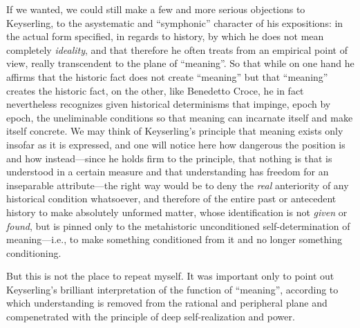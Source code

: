 If we wanted, we could still make a few and more serious objections to Keyserling, to the asystematic and ``symphonic'' character of his expositions: in the actual form specified, in regards to history, by which he does not mean completely \emph{ideality}, and that therefore he often treats from an empirical point of view, really transcendent to the plane of ``meaning''. So that while on one hand he affirms that the historic fact does not create ``meaning'' but that ``meaning'' creates the historic fact, on the other, like Benedetto Croce, he in fact nevertheless recognizes given historical determinisms that impinge, epoch by epoch, the uneliminable conditions so that meaning can incarnate itself and make itself concrete. We may think of Keyserling's principle that meaning exists only insofar as it is expressed, and one will notice here how dangerous the position is and how instead---since he holds firm to the principle, that nothing is that is understood in a certain measure and that understanding has freedom for an inseparable attribute---the right way would be to deny the \emph{real} anteriority of any historical condition whatsoever, and therefore of the entire past or antecedent history to make absolutely unformed matter, whose identification is not \emph{given} or \emph{found}, but is pinned only to the metahistoric unconditioned self-determination of meaning---i.e., to make something conditioned from it and no longer something conditioning.

But this is not the place to repeat myself. It was important only to point out Keyserling's brilliant interpretation of the function of ``meaning'', according to which understanding is removed from the rational and peripheral plane and compenetrated with the principle of deep self-realization and power.



